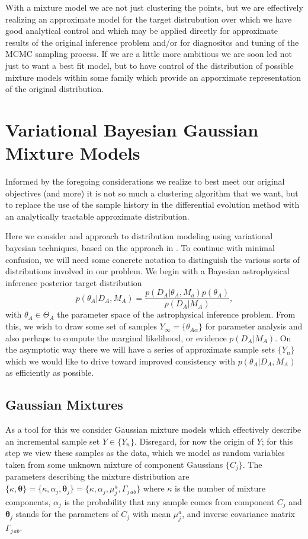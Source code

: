 \documentclass[aps,showpacs,twocolumn,prd,superscriptaddress,nofootinbib]{revtex4}
\newcommand{\be}{\begin{equation}}
\newcommand{\ee}{\end{equation}}
\begin{document}
With a mixture model we are not just clustering the points, but we are effectively realizing an approximate model for the target distrubution over which we have good analytical control and which may be applied directly for approximate results of the original inference problem and/or for diagnositcs and tuning of the MCMC sampling process.  If we are a little more ambitious we are soon led not just to want a best fit model, but to have control of the distribution of possible mixture models within some family which provide an apporximate representation of the original distribution.

\section{Variational Bayesian Gaussian Mixture Models}

Informed by the foregoing considerations we realize to best meet our original objectives (and more) it is not so much a clustering algorithm that we want, but to replace the use of the sample history in the differential evolution method with an analytically tractable approximate distribution.

Here we consider and approach to distribution modeling using variational bayesian techniques, based on the approach in \cite{Attias2000}.  To continue with minimal confusion, we will need some concrete notation to distinguish the various sorts of distributions involved in our problem. We begin with a Bayesian astrophysical inference posterior target distribution
\be
p(\theta_A|D_A,M_A)=\frac{p(D_A|\theta_A,M_a)p(\theta_A)}{p(D_A|M_A)},
\ee
with $\theta_A\in\Theta_A$ the parameter space of the astrophysical inference problem.
From this, we wish to draw some set of samples $Y_\infty=\{\theta_{A\alpha}\}$ for parameter analysis and also perhaps to compute the marginal likelihood, or evidence $p(D_A|M_A)$.  On the asymptotic way there we will have a series of approximate sample sets $\{Y_n\}$ which we would like to drive toward improved consistency with $p(\theta_A|D_A,M_A)$ as efficiently as possible.

\subsection{Gaussian Mixtures}

As a tool for this we consider Gaussian mixture models which effectively describe an incremental sample set $Y\in\{Y_n\}$.  Disregard, for now the origin of $Y$; for this step we view these samples as the data, which we model as random variables taken from some unknown mixture of component Gaussians $\{C_j\}$.  The parameters describing the mixture distribution are $\{\kappa,\bm\theta\}=\{\kappa,\alpha_j,\bm\theta_j\}=\{\kappa,\alpha_j,\mu_j^a, \Gamma_{j\,ab}\}$ where $\kappa$ is the number of mixture components, $\alpha_j$ is the probability that any sample comes from component $C_j$ and $\bm\theta_j$ stands for the parameters of $C_j$ with mean $\mu_j^a$, and inverse covariance matrix $\Gamma_{j\,ab}$.
\end{document}
